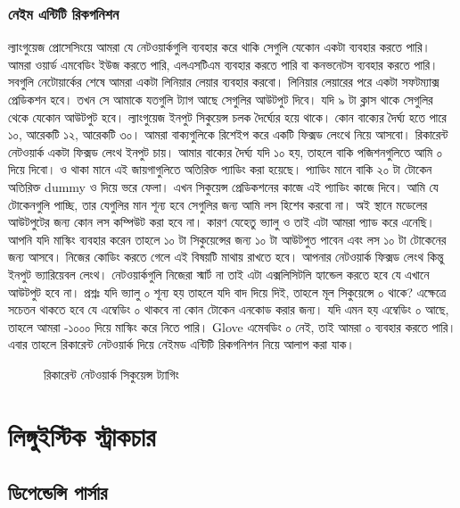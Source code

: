 \documentclass{article}[book]
\begin{document}
\subsubsection{নেইম এন্টিটি রিকগনিশন}
ল্যাংগুয়েজ প্রোসেসিংয়ে আমরা যে নেটওয়ার্কগুলি ব্যবহার করে থাকি সেগুলি যেকোন একটা ব্যবহার করতে পারি। আমরা ওয়ার্ড এমবেডিং ইউজ করতে পারি, এলএসটিএম ব্যবহার করতে পারি বা কনভনেটস ব্যবহার করতে পারি। সবগুলি নেটোয়ার্কের শেষে আমরা একটা লিনিয়ার লেয়ার ব্যবহার করবো। লিনিয়ার লেয়ারের পরে একটা সফটম্যাক্স প্রেডিকশন হবে। তখন সে আমাকে যতগুলি ট্যাগ আছে সেগুলির আউটপুট দিবে। যদি ৯ টা ক্লাস থাকে সেগুলির থেকে যেকোন আউটপুট হবে। ল্যাংগুয়েজ ইনপুট সিকুয়েন্স চলক দৈর্ঘ্যের হয়ে থাকে। কোন বাক্যের দৈর্ঘ্য হতে পারে ১০, আরেকটি ১২, আরেকটি ৩০। আমরা বাক্যগুলিকে রিশেইপ করে একটি ফিক্সড লেংথে নিয়ে আসবো। রিকারেন্ট নেটওয়ার্ক একটা ফিক্সড লেংথ ইনপুট চায়। আমার বাক্যের দৈর্ঘ্য যদি ১০ হয়, তাহলে বাকি পজিশনগুলিতে আমি ০ দিয়ে দিবো। ও থাকা মানে এই জায়গাগুলিতে অতিরিক্ত প্যাডিং করা হয়েছে। প্যাডিং মানে বাকি ২০ টা টোকেন অতিরিক্ত dummy ও দিয়ে ভরে ফেলা। এখন সিকুয়েন্স প্রেডিকশনের কাজে এই প্যাডিং কাজে দিবে। আমি যে টোকেনগুলি পাচ্ছি, তার যেগুলির মান শূন্য হবে সেগুলির জন্য আমি লস হিশেব করবো না। অই স্থানে মডেলের আউটপুটের জন্য কোন লস কম্পিউট করা হবে না। কারণ যেহেতু ভ্যালু ও তাই এটা আমরা প্যাড করে এনেছি। আপনি যদি মাস্কিং ব্যবহার করেন তাহলে ১০ টা সিকুয়েন্সের জন্য ১০ টা আউটপুত পাবেন এবং লস ১০ টা টোকেনের জন্য আসবে। নিজের কোডিং করতে গেলে এই বিষয়টি মাথায় রাখতে হবে। আপনার নেটওয়ার্ক ফিক্সড লেংথ কিন্তু ইনপুট ভ্যারিয়েবল লেংথ। নেটওয়ার্কগুলি নিজেরা স্মার্ট না তাই এটা এক্সলিসিটলি হ্যান্ডেল করতে হবে যে এখানে আউটপুট হবে না। প্রশ্নঃ যদি ভ্যালু ০ শূন্য হয় তাহলে যদি বাদ দিয়ে দিই, তাহলে মূল সিকুয়েন্সে ০ থাকে? এক্ষেত্রে সচেতন থাকতে হবে যে এম্বেডিং ০ থাকবে না কোন টোকেন এনকোড করার জন্য। যদি এমন হয় এম্বেডিং ০ আছে, তাহলে আমরা -১০০০ দিয়ে মাস্কিং করে নিতে পারি। Glove এমেবডিং ০ নেই, তাই আমরা ০ ব্যবহার করতে পারি। এবার তাহলে রিকারেন্ট নেটওয়ার্ক দিয়ে নেইমড এন্টিটি রিকগনিশন নিয়ে আলাপ করা যাক। 


\begin{figure}[htbp] %
   \centering
    
   \caption{রিকারেন্ট নেটওয়ার্ক সিকুয়েন্স ট্যাগিং}
   \label{fig:cbow}
\end{figure} 


\section{লিঙ্গুইস্টিক স্ট্রাকচার}
\subsection{ডিপেন্ডেন্সি পার্সার}
\end{document}
